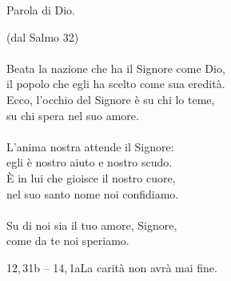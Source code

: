 Parola di Dio.\\


\vspace{10mm}

 { \small(dal Salmo 32)}\\

\\

Beata la nazione che ha il Signore come Dio,\\
il popolo che egli ha scelto come sua eredit\`a.\\
Ecco, l'occhio del Signore \`e su chi lo teme,\\
su chi spera nel suo amore.\\

\\

L'anima nostra attende il Signore:\\
egli \`e nostro aiuto e nostro scudo.\\
\`E in lui che gioisce il nostro cuore,\\
nel suo santo nome noi confidiamo.\\

\\

Su di noi sia il tuo amore, Signore,\\
come da te noi speriamo.\\


\newpage

{12,\,31b -- 14,\,1a}{La carit\`a non avr\`a mai fine.}

